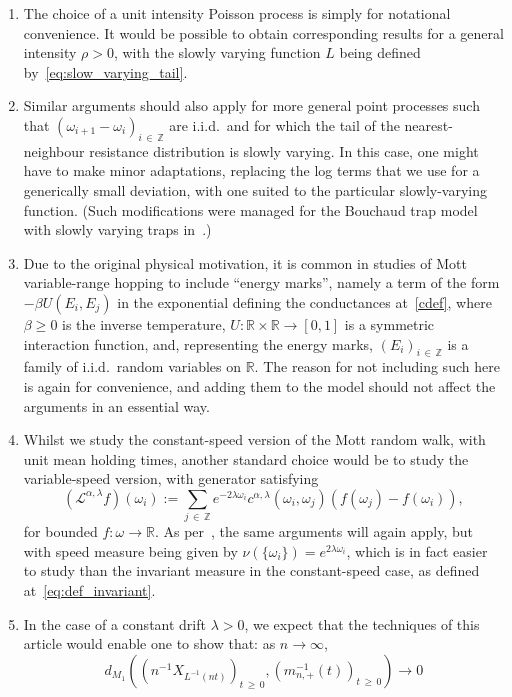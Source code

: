 \documentclass[AHL,Unicode,longabstracts,published]{cedram}
\newcommand{\Z}{\mathbb Z}
\newcommand{\R}{\mathbb R}
\newcommand{\clL}{\mathcal{L}}
\newcommand*{\alphenumi}{\renewcommand*{\theenumi}{\alph{enumi}}}
\begin{document}
\begin{rema}\leavevmode
\begin{enumerate}\alphenumi
\item The choice of a unit intensity Poisson process is simply for notational convenience. It would be possible to obtain corresponding results for a general intensity $\rho>0$, with the slowly varying function $L$ being defined by~\eqref{eq:slow_varying_tail}.
\item Similar arguments should also apply for more general point processes such that $(\omega_{i+1}-\omega_i)_{i\,\in\,\Z}$ are i.i.d.\ and for which the tail of the nearest-neighbour resistance distribution is slowly varying. In this case, one might have to make minor adaptations, replacing the log terms that we use for a generically small deviation, with one suited to the particular slowly-varying function. (Such modifications were managed for the Bouchaud trap model with slowly varying traps in~\cite{CM1}.)
\item Due to the original physical motivation, it is common in studies of Mott variable-range hopping to include ``energy marks'', namely a term of the form $-\beta U(E_i,E_j)$ in the exponential defining the conductances at~\eqref{cdef}, where $\beta\geq 0$ is the inverse temperature, $U\colon \R\times\R\to[0,1]$ is a symmetric interaction function, and, representing the energy marks, $(E_i)_{i\,\in\,\Z}$ is a family of i.i.d.\ random variables on $\R$. The reason for not including such here is again for convenience, and adding them to the model should not affect the arguments in an essential way.
\item Whilst we study the constant-speed version of the Mott random walk, with unit mean holding times, another standard choice would be to study the variable-speed version, with generator satisfying
\[
\left(\clL^{\alpha,\lambda}f\right)(\omega_i):=\sum_{j\,\in\,\Z}e^{-2\lambda\omega_i}c^{\alpha,\lambda}\left(\omega_i,\omega_j\right)\left(f(\omega_j)-f(\omega_i)\right),
\]
for bounded $f:\omega\rightarrow\R$. As per~\cite[Remarks 1.3 and 3.2]{CFJ}, the same arguments will again apply, but with speed measure being given by $\nu(\{\omega_i\})=e^{2\lambda\omega_i}$, which is in fact easier to study than the invariant measure in the constant-speed case, as defined at~\eqref{eq:def_invariant}.
\item In the case of a constant drift $\lambda>0$, we expect that the techniques of this article would enable one to show that: as $n\rightarrow\infty$,
\[
d_{M_1}\left(\left(n^{-1}{X}_{L^{-1}(n t)}\right)_{t\,\geq\,0},\left(m_{n,+}^{-1}(t)\right)_{t\,\geq\,0}\right)\rightarrow 0
\]
\end{enumerate}
\end{rema}
\end{document}
